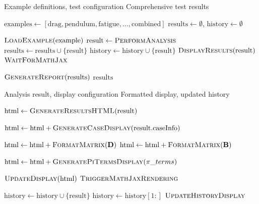 \documentclass[
	11pt, %
	fleqn, %
	a4paper, %
]{LegrandOrangeBook}
\begin{document}
\begin{algorithm}[H]
\caption{Auto-Test Execution for All Examples}
\begin{algorithmic}[1]
\Require Example definitions, test configuration
\Ensure Comprehensive test results

    \State $\text{examples} \gets [\text{drag}, \text{pendulum}, \text{fatigue}, \ldots, \text{combined}]$
    \State $\text{results} \gets \emptyset$, $\text{history} \gets \emptyset$

        \State $\Call{LoadExample}{\text{example}}$
        \State $\text{result} \gets \Call{PerformAnalysis}{}$
        \State $\text{results} \gets \text{results} \cup \{\text{result}\}$
        \State $\text{history} \gets \text{history} \cup \{\text{result}\}$
        \State $\Call{DisplayResults}{\text{result}}$
        \State $\Call{WaitForMathJax}{}$ 
    \EndFor

    \State $\Call{GenerateReport}{\text{results}}$
    \State \Return $\text{results}$
\EndFunction
\end{algorithmic}
\end{algorithm}

\begin{algorithm}[H]
\caption{Result Display and History Management}
\begin{algorithmic}[1]
\Require Analysis result, display configuration
\Ensure Formatted display, updated history

    \State $\text{html} \gets \Call{GenerateResultsHTML}{\text{result}}$

    \State {}
        \State $\text{html} \gets \text{html} + \Call{GenerateCaseDisplay}{\text{result.caseInfo}}$
    \EndIf

    \State {}
    \State $\text{html} \gets \text{html} + \Call{FormatMatrix}{\mathbf{D}}$
    \State $\text{html} \gets \text{html} + \Call{FormatMatrix}{\mathbf{B}}$

    \State {}
        \State $\text{html} \gets \text{html} + \Call{GeneratePiTermsDisplay}{\pi\_terms}$
    \EndIf

    \State $\Call{UpdateDisplay}{\text{html}}$
    \State $\Call{TriggerMathJaxRendering}{}$
\EndFunction

    \State $\text{history} \gets \text{history} \cup \{\text{result}\}$
        \State $\text{history} \gets \text{history}[1:]$ 
    \EndIf
    \State $\Call{UpdateHistoryDisplay}{}$
\EndFunction
\end{algorithmic}
\end{algorithm}
\end{document}
